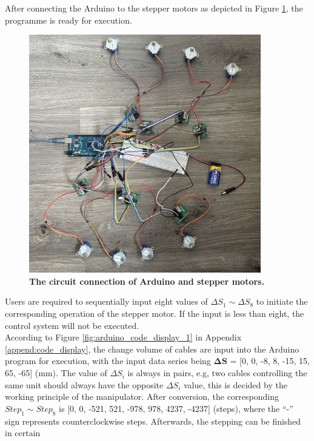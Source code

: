 After connecting the Arduino to the stepper motors as depicted in Figure \ref{fig:circuit_connection}, 
the programme is ready for execution.
\begin{figure}[H] %
    \centering 
    \captionsetup{labelsep=colon}
    \includegraphics[width=0.9\textwidth]{Image/Result/circuit_connection.jpg} 
    \caption[The circuit connection of Arduino and stepper motors]
    {\centering \textbf{The circuit connection of Arduino and stepper motors.}}
    \label{fig:circuit_connection}
\end{figure}
\noindent Users are required to sequentially input eight values of $\Delta S_1 \sim \Delta S_8$ to initiate 
the corresponding operation of the stepper motor. If the input is less than eight, the control system will 
not be executed. \\
According to Figure \ref{fig:arduino_code_display_1} in Appendix \ref{append:code_display}, the change volume 
of cables are input into the Arduino program for execution, with the input data series being $\boldsymbol{\Delta S}$ 
= [0, 0, -8, 8, -15, 15, 65, -65] (mm). The value of $\Delta S_i$ is always in pairs, e.g, two cables controlling 
the same unit should always have the opposite $\Delta S_i$ value, this is decided by the working principle of the 
manipulator. After conversion, the corresponding $Step_1 \sim Step_8$ is [0, 0, -521, 521, -978, 978, 4237, -4237] 
(steps), where the “-” sign represents counterclockwise steps. Afterwards, the stepping can be finished in certain 
